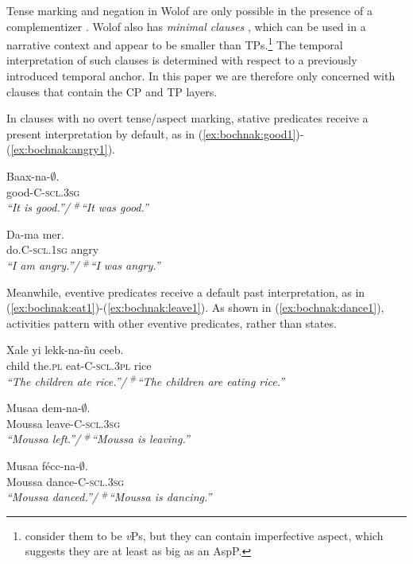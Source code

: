 \documentclass[output=paper,newtxmath,modfonts,nonflat,draftmode]{langsci/langscibook}
\begin{document}
 Tense marking and negation in Wolof are only
possible in the presence of a complementizer \citep{Njie1982}. Wolof
also has \textit{minimal clauses} \citep{Sauvageot1965,
  church81systeme,  Dialo1981, robert91approche,
  Zribi-HertzDiagne2003}, which can be used in a narrative context and
appear to be smaller than TPs.\footnote{\cite{Zribi-HertzDiagne2003} consider
them to be \textit{v}Ps, but they can contain imperfective aspect,
which suggests they are at least as big as an AspP.} The temporal interpretation of such
clauses is determined with respect to a previously introduced
temporal anchor. In this paper we
are therefore only concerned with clauses that contain the CP and TP layers.

In clauses with no overt tense/aspect marking, stative predicates receive a present interpretation by default, as in (\ref{ex:bochnak:good1})-(\ref{ex:bochnak:angry1}).

\ea
\gll Baax-na-$\emptyset$.\\
good-C-\textsc{scl.3sg}\\
\glt \textit{``It is good.''/ $^{\#}$``It was good.''}\label{ex:bochnak:good1}
\z

\ea
\gll Da-ma mer.\\
do.C-\textsc{scl.1sg} angry\\
\glt \textit{``I am angry.''/ $^{\#}$``I was angry.''}\label{ex:bochnak:angry1}
\z

Meanwhile, eventive predicates receive a default past interpretation, as in (\ref{ex:bochnak:eat1})-(\ref{ex:bochnak:leave1}). As shown in (\ref{ex:bochnak:dance1}), activities pattern with other eventive predicates, rather than states.

\ea
\gll Xale yi lekk-na-\~nu ceeb.\\
child the.\textsc{pl} eat-C-\textsc{scl.3pl} rice\\
\glt \textit{``The children ate rice.''/ $^{\#}$``The children are eating
  rice.''}\label{ex:bochnak:eat1}
\z
 
\ea
\gll Musaa dem-na-$\emptyset$.\\
Moussa leave-C-\textsc{scl.3sg}\\
\glt \textit{``Moussa left.''/ $^{\#}$``Moussa is leaving.''}\label{ex:bochnak:leave1}
\z

\ea
\gll Musaa f\'ecc-na-$\emptyset$.\\
Moussa dance-C-\textsc{scl.3sg}\\
\glt \textit{``Moussa danced.''/ $^{\#}$``Moussa is dancing.''}\label{ex:bochnak:dance1}
\z
\end{document}

